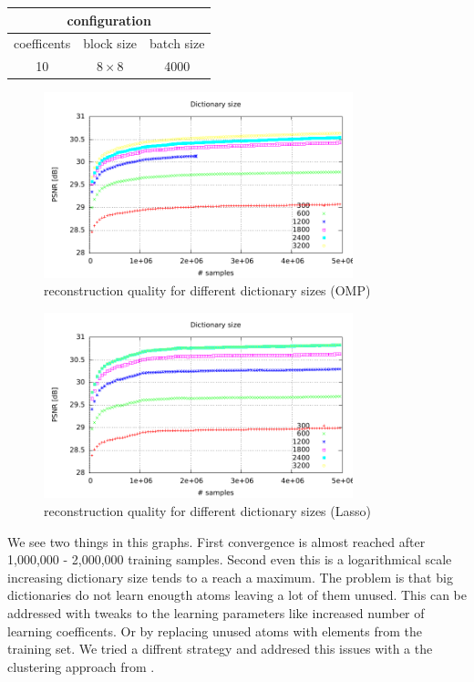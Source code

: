 \begin{table}[H]
\centering
\begin{tabular}{| c | c | c |}
\hline
\multicolumn{3}{|c|}{configuration}\\
\hline
coefficents & block size & batch size \\
\hline
10 & $8\times 8$ & 4000  \\
\hline
\end{tabular}
\end{table}

\begin{figure}[h]
\centering
\includegraphics[width = 0.8\textwidth]{../tests/results/dictSizeOMP.pdf}
\caption{reconstruction quality for different dictionary sizes (OMP)}
\label{fig:dictSizeOMP}
\end{figure}

\begin{figure}[h]
\centering
\includegraphics[width = 0.8\textwidth]{../tests/results/dictSizeLasso.pdf}
\caption{reconstruction quality for different dictionary sizes (Lasso)}
\label{fig:dict size}
\end{figure}

We see two things in this graphs. First convergence is almost reached
after 1,000,000 - 2,000,000 training samples. Second even this is a
logarithmical scale increasing dictionary size tends to a reach a maximum. The
problem is that big dictionaries do not learn enougth atoms leaving a lot of
them unused. This can be addressed with tweaks to the learning parameters like
increased number of learning coefficents. Or by replacing unused atoms with
elements from the training set. We tried a diffrent strategy and addresed this
issues with a the clustering approach from .

